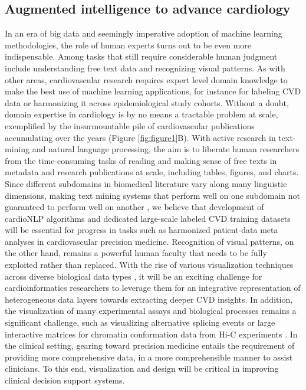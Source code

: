 \documentclass[letter]{bioinfo}
\begin{document}
	
	\subsection*{Augmented intelligence to advance cardiology}
	In an era of big data and seemingly imperative adoption of machine learning methodologies, the role of human experts turns out to be even more indispensable. Among tasks that still require considerable human judgment include understanding free text data and recognizing visual patterns.  As with other areas, cardiovascular research requires expert level domain knowledge to make the best use of machine learning applications, for instance for labeling CVD data or harmonizing it across epidemiological study cohorts.  Without a doubt, domain expertise in cardiology is by no means a tractable problem at scale, exemplified by the insurmountable pile of cardiovascular publications accumulating over the years (Figure \ref{fig:figure1}B).  With active research in text-mining and natural language processing, the aim is to liberate human researchers from the time-consuming tasks of reading and making sense of free texts in metadata and research publications at scale, including tables, figures, and charts. Since different subdomains in biomedical literature vary along many linguistic dimensions, making text mining systems that perform well on one subdomain not guaranteed to perform well on another \citep{Lippincott:2011:Exploring, Kilicoglu:2018:Biomedical, Khomtchouk:2018:Biochat}, we believe that development of cardioNLP algorithms and dedicated large-scale labeled CVD training datasets will be essential for progress in tasks such as harmonized patient-data meta analyses in cardiovascular precision medicine.
	Recognition of visual patterns, on the other hand, remains a powerful human faculty that needs to be fully exploited rather than replaced. With the rise of various visualization techniques across diverse biological data types \citep{Pavlopoulos:2015:Visualizing}, it will be an exciting challenge for cardioinformatics researchers to leverage them for an integrative representation of heterogeneous data layers towards extracting deeper CVD insights. In addition, the visualization of many experimental assays and biological processes remains a significant challenge, such as visualizing alternative splicing events \citep{Katz:2015:Quantitative,Strobelt:2016:Vials} or large interactive matrices for chromatin conformation data from Hi-C experiments \citep{Kerpedjiev:2018:HiGlass,Lekschas:2018:HiPiler}. In the clinical setting, gearing toward precision medicine entails the requirement of providing more comprehensive data, in a more comprehensible manner to assist clinicians. To this end, visualization and design will be critical in improving clinical decision support systems.
\end{document}
